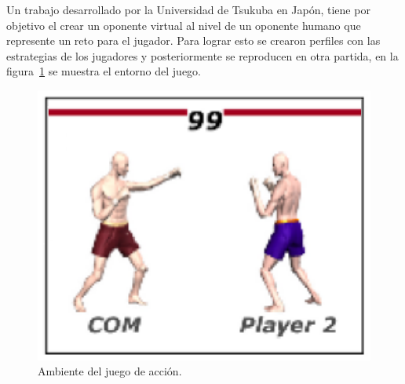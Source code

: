 
Un trabajo desarrollado por la Universidad de Tsukuba en
 Jap\'on\cite{Nakano2006}, tiene por objetivo el crear un oponente virtual
 al nivel de un oponente humano que represente un reto para el jugador. Para
 lograr esto se crearon perfiles con las estrategias de los jugadores y
 posteriormente se reproducen en otra partida, en la figura~\ref{fig:imitat}
 se muestra el entorno del juego.


\begin{figure}[h]
\centering
\includegraphics[width=0.5\columnwidth]{chap2/Imagenes/Imitating.eps}
\caption{Ambiente del juego de acci\'on\cite{Nakano2006}.}
\label{fig:imitat}
\end{figure}